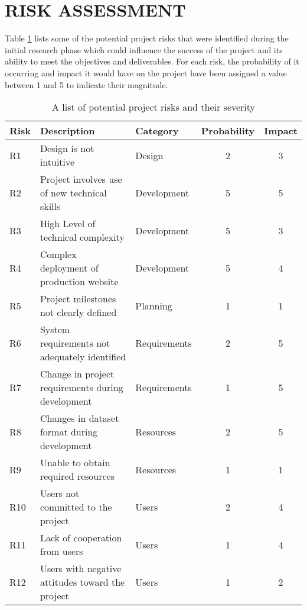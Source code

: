 \newpage
\section{RISK ASSESSMENT \hrulefill}

Table \ref{tab:risk-assessment} lists some of the potential project risks that
were identified during the initial research phase which could influence the
success of the project and its ability to meet the objectives and
deliverables. For each risk, the probability of it occurring and impact it would
have on the project have been assigned a value between 1 and 5 to indicate their
magnitude.

\begin{table}[H]
\centering
\begin{tabular}{ | l | l | l || c | c | }
\hline
Risk & Description & Category & Probability & Impact\\
\hline
R1  & Design is not intuitive                           & Design       & 2 & 3\\
R2  & Project involves use of new technical skills      & Development  & 5 & 5\\
R3  & High Level of technical complexity                & Development  & 5 & 3\\
R4  & Complex deployment of production website          & Development  & 5 & 4\\
R5  & Project milestones not clearly defined            & Planning     & 1 & 1\\
R6  & System requirements not adequately identified     & Requirements & 2 & 5\\
R7  & Change in project requirements during development & Requirements & 1 & 5\\
R8  & Changes in dataset format during development      & Resources    & 2 & 5\\
R9  & Unable to obtain required resources               & Resources    & 1 & 1\\
R10 & Users not committed to the project                & Users        & 2 & 4\\
R11 & Lack of cooperation from users                    & Users        & 1 & 4\\
R12 & Users with negative attitudes toward the project  & Users        & 1 & 2\\
\hline
\end{tabular}
\caption{A list of potential project risks and their severity}
\label{tab:risk-assessment}
\end{table}

